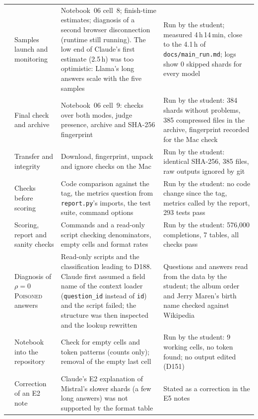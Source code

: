 \documentclass[11pt,a4paper]{report}
\begin{document}
{\begin{longtable}{
  >{\raggedright\arraybackslash}p{0.6cm}
  >{\raggedright\arraybackslash}p{4.4cm}
  >{\raggedright\arraybackslash}p{4.4cm}
  >{\raggedright\arraybackslash}p{4.8cm}}
110 & Samples launch and monitoring
  & Notebook~06 cell~8; finish-time estimates; diagnosis of a second browser disconnection (runtime still running). The low end of Claude's first estimate (2.5\,h) was too optimistic: Llama's long answers scale with the five samples
  & Run by the student; measured 4\,h\,14\,min, close to the 4.1\,h of \texttt{docs/main\_run.md}; logs show 0 skipped shards for every model \\
111 & Final check and archive
  & Notebook~06 cell~9: checks over both modes, judge presence, archive and SHA-256 fingerprint
  & Run by the student: 384 shards without problems, 385 compressed files in the archive, fingerprint recorded for the Mac check \\

112 & Transfer and integrity
  & Download, fingerprint, unpack and ignore checks on the Mac
  & Run by the student: identical SHA-256, 385 files, raw outputs ignored by git \\
113 & Checks before scoring
  & Code comparison against the tag, the metrics question from \texttt{report.py}'s imports, the test suite, command options
  & Run by the student: no code change since the tag, metrics called by the report, 293 tests pass \\
114 & Scoring, report and sanity checks
  & Commands and a read-only script checking denominators, empty cells and format rates
  & Run by the student: 576{,}000 completions, 7 tables, all checks pass \\
115 & Diagnosis of $\rho=0$ \textsc{Poisoned} answers
  & Read-only scripts and the classification leading to D188. Claude first assumed a field name of the context loader (\texttt{question\_id} instead of \texttt{id}) and the script failed; the structure was then inspected and the lookup rewritten
  & Questions and answers read from the data by the student; the album order and Jerry Maren's birth name checked against Wikipedia \\
116 & Notebook into the repository
  & Check for empty cells and token patterns (counts only); removal of the empty last cell
  & Run by the student: 9 working cells, no token found; no output edited (D151) \\
117 & Correction of an E2 note
  & Claude's E2 explanation of Mistral's slower shards (a few long answers) was not supported by the format table
  & Stated as a correction in the E5 notes \\

\end{longtable}
}
\end{document}
